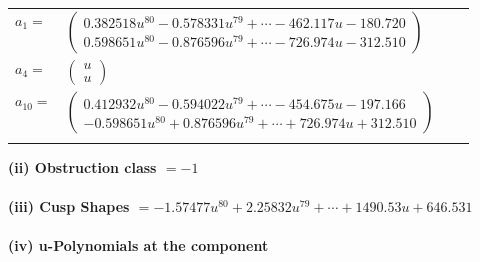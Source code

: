 \documentclass[1p]{elsarticle_modified}
\theoremstyle{definition}
\begin{document}
\begin{tabular}{m{7pt} m{180pt} m{7pt} m{180pt} }
\flushright $a_{1}=$&$\begin{pmatrix}0.382518 u^{80}-0.578331 u^{79}+\cdots-462.117 u-180.720\\0.598651 u^{80}-0.876596 u^{79}+\cdots-726.974 u-312.510\end{pmatrix}$ \\
\flushright $a_{4}=$&$\begin{pmatrix}u\\u\end{pmatrix}$ \\
\flushright $a_{10}=$&$\begin{pmatrix}0.412932 u^{80}-0.594022 u^{79}+\cdots-454.675 u-197.166\\-0.598651 u^{80}+0.876596 u^{79}+\cdots+726.974 u+312.510\end{pmatrix}$\\&\end{tabular}
\flushleft \textbf{(ii) Obstruction class $= -1$}\\~\\
\flushleft \textbf{(iii) Cusp Shapes $= -1.57477 u^{80}+2.25832 u^{79}+\cdots+1490.53 u+646.531$}\\~\\
\newpage\renewcommand{\arraystretch}{1}
\flushleft \textbf{(iv) u-Polynomials at the component}\newline \\
\end{document}

